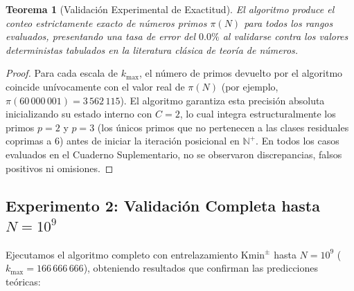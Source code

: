 \documentclass{article}
\numberwithin{equation}{section}
\theoremstyle{plain}
\newtheorem{theorem}{Teorema}[section]
\theoremstyle{definition}
\begin{document}
\begin{theorem}[Validación Experimental de Exactitud]
\label{thm:validacion-experimental}
El algoritmo produce el conteo estrictamente exacto de números primos $\pi(N)$ para todos los rangos evaluados, presentando una tasa de error del $0.0\%$ al validarse contra los valores deterministas tabulados en la literatura clásica de teoría de números.
\end{theorem}

\begin{proof}
Para cada escala de $k_{\max}$, el número de primos devuelto por el algoritmo coincide unívocamente con el valor real de $\pi(N)$ (por ejemplo, $\pi(60\,000\,001) = 3\,562\,115$). El algoritmo garantiza esta precisión absoluta inicializando su estado interno con $C=2$, lo cual integra estructuralmente los primos $p=2$ y $p=3$ (los únicos primos que no pertenecen a las clases residuales coprimas a $6$) antes de iniciar la iteración posicional en $\mathbb{N}^+$. En todos los casos evaluados en el Cuaderno Suplementario, no se observaron discrepancias, falsos positivos ni omisiones.
\end{proof}

\subsection{Experimento 2: Validación Completa hasta $N=10^9$}

Ejecutamos el algoritmo completo con entrelazamiento $\mathrm{Kmin}^\pm$ hasta $N=10^9$ ($k_{\max}=166\,666\,666$), obteniendo resultados que confirman las predicciones teóricas:
\end{document}
